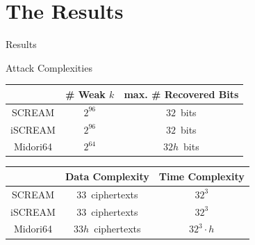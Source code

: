 \section{The Results}
\begin{frame}{Results}{}
    \begin{block}{Attack Complexities}
        \centering
        \begin{tabular}{ccc}
            \toprule
                   & \# Weak $k$ & max. \# Recovered Bits \\
            \midrule
             SCREAM &  $2^{96} $  &       $32$~bits  \\
            iSCREAM &  $2^{96} $  &       $32$~bits  \\
           Midori64 &  $2^{64} $  &      $32h$~bits  \\
            \bottomrule
        \end{tabular}

        \begin{tabular}{ccc}
            \toprule
                   & Data Complexity & Time Complexity \\
            \midrule
             SCREAM &  $33$~ciphertexts  & $32^3$  \\
            iSCREAM &  $33$~ciphertexts  & $32^3$  \\
           Midori64 &  $33h$~ciphertexts & $32^3 \cdot h$  \\
            \bottomrule
        \end{tabular}
    \end{block}
\end{frame}
